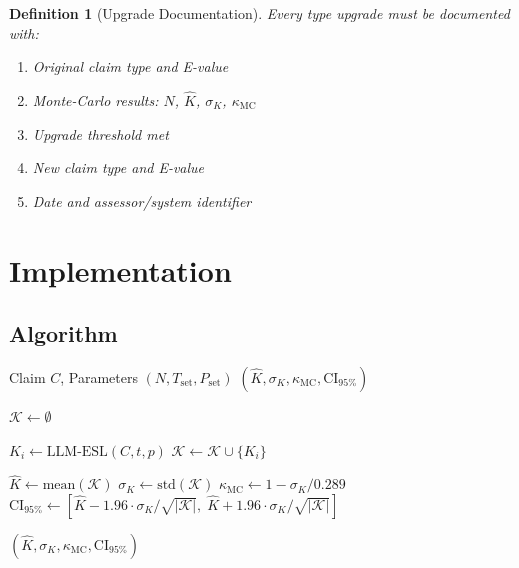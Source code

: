\documentclass[11pt,a4paper]{article}
\newtheorem{definition}{Definition}[section]
\theoremstyle{remark}
\begin{document}
\begin{definition}[Upgrade Documentation]
\label{def:upgrade-doc}
Every type upgrade must be documented with:
\begin{enumerate}
    \item Original claim type and E-value
    \item Monte-Carlo results: $N$, $\hat{K}$, $\sigma_K$, $\kappa_{\text{MC}}$
    \item Upgrade threshold met
    \item New claim type and E-value
    \item Date and assessor/system identifier
\end{enumerate}
\end{definition}


\section{Implementation}
\label{sec:implementation}

\subsection{Algorithm}

\begin{algorithmbox}[title={Monte-Carlo ESL Assessment}]
\begin{algorithmic}[1]
\Require Claim $C$, Parameters $(N, T_{\text{set}}, P_{\text{set}})$
\Ensure $(\hat{K}, \sigma_K, \kappa_{\text{MC}}, \text{CI}_{95\%})$

\State $\mathcal{K} \gets \emptyset$

 
     
         
            \State $K_i \gets \text{LLM-ESL}(C, t, p)$
            \State $\mathcal{K} \gets \mathcal{K} \cup \{K_i\}$
        \EndFor
    \EndFor
\EndFor

\State $\hat{K} \gets \text{mean}(\mathcal{K})$
\State $\sigma_K \gets \text{std}(\mathcal{K})$
\State $\kappa_{\text{MC}} \gets 1 - \sigma_K / 0.289$
\State $\text{CI}_{95\%} \gets [\hat{K} - 1.96 \cdot \sigma_K / \sqrt{|\mathcal{K}|}, \; \hat{K} + 1.96 \cdot \sigma_K / \sqrt{|\mathcal{K}|}]$

\Return $(\hat{K}, \sigma_K, \kappa_{\text{MC}}, \text{CI}_{95\%})$
\end{algorithmic}
\end{algorithmbox}
\end{document}

